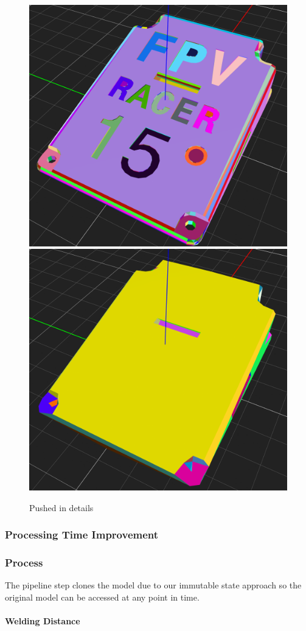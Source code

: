 \documentclass[../ClassicThesis.tex]{subfiles}
\begin{document}
\begin{figure}
\includegraphics[width=0.5\columnwidth]{Images/04-approx-welding-pushedIn.png}
\includegraphics[width=0.5\columnwidth]{Images/04-approx-welding-pushedIn-result.png}
\caption{Pushed in details}
\label{fig:pushed_in_details}
\end{figure}


\subsubsection{Processing Time Improvement}



\subsubsection{Process}

The pipeline step clones the model due to our immutable state approach so the original model can be accessed at any point in time.


\paragraph{Welding Distance}
\end{document}
